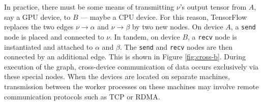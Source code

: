 In practice, there must be some means of transmitting $\nu$'s output tensor from
$A$, say a GPU device, to $B$ --- maybe a CPU device. For this reason,
TensorFlow replaces the two edges $\nu \rightarrow \alpha$ and
$\nu \rightarrow \beta$ by two new nodes. On device $A$, a \texttt{send} node is
placed and connected to $\nu$. In tandem, on device $B$, a \texttt{recv} node is
instantiated and attached to $\alpha$ and $\beta$. The \texttt{send} and
\texttt{recv} nodes are then connected by an additional edge. This is shown in
Figure \ref{fig:cross-b}. During execution of the graph, cross-device
communication of data occurs exclusively via these special nodes. When the
devices are located on separate machines, transmission between the worker
processes on these machines may involve remote communication protocols such as
TCP or RDMA.

